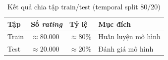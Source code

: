 ﻿\documentclass[../BTL.tex]{subfiles}
\begin{document}
\begin{table}[H]
    \centering
    \caption{Kết quả chia tập train/test (temporal split 80/20)}
    \label{tab:split}
    \begin{tabular}{llll}
        \toprule
        \textbf{Tập} & \textbf{Số \textit{rating}} & \textbf{Tỷ lệ}
                     & \textbf{Mục đích} \\
        \midrule
        Train & ${\approx}80.000$ & ${\approx}80\%$
              & Huấn luyện mô hình \\
        Test  & ${\approx}20.000$ & ${\approx}20\%$
              & Đánh giá mô hình \\
        \bottomrule
    \end{tabular}
\end{table}

\end{document}

